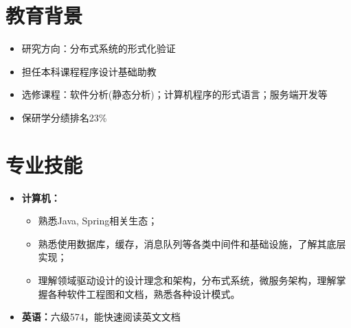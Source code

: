 \documentclass{resume}
\begin{document}

\sepspace
{}

\section{教育背景}
\begin{itemize}
    \item 研究方向：分布式系统的形式化验证
    \item 担任本科课程程序设计基础助教
\end{itemize}
\begin{itemize}
    \item 选修课程：软件分析(静态分析)；计算机程序的形式语言；服务端开发等
    \item 保研学分绩排名23\%
\end{itemize}
\sepspace

\section{专业技能}
\begin{itemize}
    \item \textbf{计算机：}
    \begin{itemize}
        \item 熟悉Java, Spring相关生态；
        \item 熟悉使用数据库，缓存，消息队列等各类中间件和基础设施，了解其底层实现；
        \item 理解领域驱动设计的设计理念和架构，分布式系统，微服务架构，理解掌握各种软件工程图和文档，熟悉各种设计模式。
    \end{itemize}
    \item \textbf{英语：}{六级574，能快速阅读英文文档}
\end{itemize}
\sepspace
\end{document}

